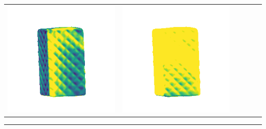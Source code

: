 \begin{tabularx}{\linewidth}{@{}Y@{}Y@{}Y@{}Y@{}Y@{}Y@{}}
\includegraphics[width=\linewidth]{semisynthetic/20160617_18_marrnet_err.png} &
\includegraphics[width=\linewidth]{semisynthetic/20160617_18_ef_err.png} \\
\end{tabularx}
\begin{center}\rule{0.5\linewidth}{\linethickness}\end{center}

